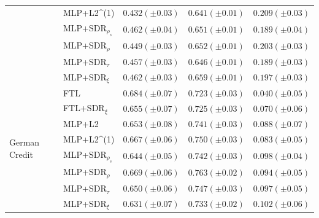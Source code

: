 \begin{tabular}{lllll}
 & MLP+L2^{(1)} & $0.432 (\pm0.03)$ & $0.641 (\pm0.01)$ & $0.209 (\pm0.03)$ \\
 & MLP+SDR$_{\rho_s}$ & $0.462 (\pm0.04)$ & $0.651 (\pm0.01)$ & $0.189 (\pm0.04)$ \\
 & MLP+SDR$_{\rho}$ & $0.449 (\pm0.03)$ & $0.652 (\pm0.01)$ & $0.203 (\pm0.03)$ \\
 & MLP+SDR$_{\tau}$ & $0.457 (\pm0.03)$ & $0.646 (\pm0.01)$ & $0.189 (\pm0.03)$ \\
 & MLP+SDR$_{\xi}$ & $0.462 (\pm0.03)$ & $0.659 (\pm0.01)$ & $0.197 (\pm0.03)$ \\
\cline{1-5}
\multirow[t]{8}{*}{German Credit} & FTL & $0.684 (\pm0.07)$ & $0.723 (\pm0.03)$ & $0.040 (\pm0.05)$ \\
 & FTL+SDR$_{\xi}$ & $0.655 (\pm0.07)$ & $0.725 (\pm0.03)$ & $0.070 (\pm0.06)$ \\
 & MLP+L2 & $0.653 (\pm0.08)$ & $0.741 (\pm0.03)$ & $0.088 (\pm0.07)$ \\
 & MLP+L2^{(1)} & $0.667 (\pm0.06)$ & $0.750 (\pm0.03)$ & $0.083 (\pm0.05)$ \\
 & MLP+SDR$_{\rho_s}$ & $0.644 (\pm0.05)$ & $0.742 (\pm0.03)$ & $0.098 (\pm0.04)$ \\
 & MLP+SDR$_{\rho}$ & $0.669 (\pm0.06)$ & $0.763 (\pm0.02)$ & $0.094 (\pm0.05)$ \\
 & MLP+SDR$_{\tau}$ & $0.650 (\pm0.06)$ & $0.747 (\pm0.03)$ & $0.097 (\pm0.05)$ \\
 & MLP+SDR$_{\xi}$ & $0.631 (\pm0.07)$ & $0.733 (\pm0.02)$ & $0.102 (\pm0.06)$ \\
\cline{1-5}
\bottomrule
\end{tabular}
